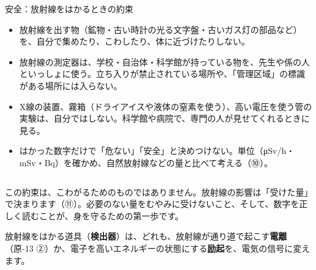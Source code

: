 \label{ph:原-14:sec1}
\begin{column}{安全：放射線をはかるときの約束}
\begin{itemize}[label={\color{bkTheme}●}, leftmargin=1.6\zw, itemsep=1pt, topsep=1pt]
\item 放射線を出す物（鉱物・古い時計の光る文字盤・古いガス灯の部品など）を、自分で集めたり、こわしたり、体に近づけたりしない。
\item 放射線の測定器は、学校・自治体・科学館が持っている物を、先生や係の人といっしょに使う。立ち入りが禁止されている場所や、「管理区域」の標識がある場所には入らない。
\item X線の装置、霧箱（ドライアイスや液体の窒素を使う）、高い電圧を使う管の実験は、自分ではしない。科学館や病院で、専門の人が見せてくれるときに見る。
\item はかった数字だけで「危ない」「安全」と決めつけない。単位（\si{\micro Sv/h}・mSv・Bq）を確かめ、自然放射線などの量と比べて考える（⑩）。
\end{itemize}
\end{column}
この約束は、こわがるためのものではありません。放射線の影響は「受けた量」で決まります（⑪）。必要のない量をむやみに受けないこと、そして、数字を正しく読むことが、身を守るための第一歩です。

\label{ph:原-14:sec2}
放射線をはかる道具（\textbf{検出器}）は、どれも、放射線が通り道で起こす\textbf{電離}（原-13 ②）か、電子を高いエネルギーの状態にする\textbf{励起}を、電気の信号に変えます。

